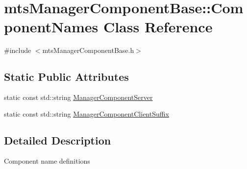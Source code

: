 \hypertarget{classmts_manager_component_base_1_1_component_names}{\section{mts\-Manager\-Component\-Base\-:\-:Component\-Names Class Reference}
\label{classmts_manager_component_base_1_1_component_names}
}


{\ttfamily \#include $<$mts\-Manager\-Component\-Base.\-h$>$}

\subsection*{Static Public Attributes}
\begin{DoxyCompactItemize}
\item 
static const std\-::string \hyperlink{classmts_manager_component_base_1_1_component_names_ac0d5e1fbe029076826e635b1d309cb41}{Manager\-Component\-Server}
\item 
static const std\-::string \hyperlink{classmts_manager_component_base_1_1_component_names_a7d237d677cbf6bf322307d4cae5f5a4d}{Manager\-Component\-Client\-Suffix}
\end{DoxyCompactItemize}


\subsection{Detailed Description}
Component name definitions 

